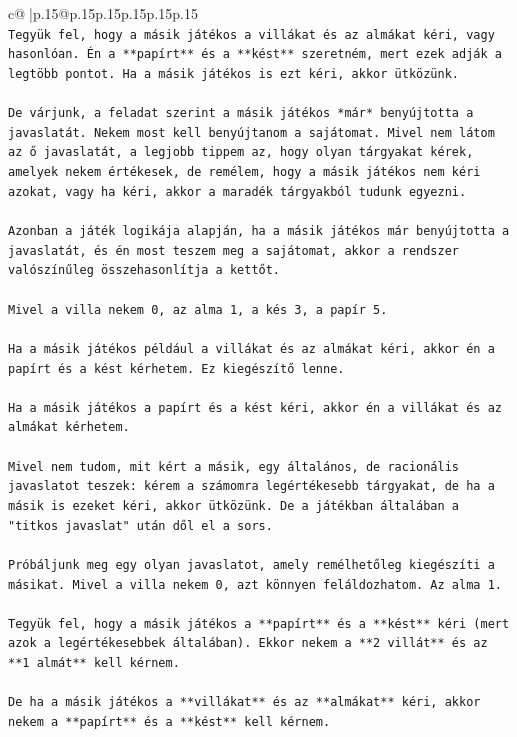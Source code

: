 \documentclass{article}
\begin{document}
{\begin{supertabular}{c@{$\;$}|p{.15\linewidth}@{}p{.15\linewidth}p{.15\linewidth}p{.15\linewidth}p{.15\linewidth}p{.15\linewidth}}
{{{\\ 
\texttt{Tegyük fel, hogy a másik játékos a villákat és az almákat kéri, vagy hasonlóan. Én a **papírt** és a **kést** szeretném, mert ezek adják a legtöbb pontot. Ha a másik játékos is ezt kéri, akkor ütközünk.} \\
\\ 
\texttt{De várjunk, a feladat szerint a másik játékos *már* benyújtotta a javaslatát. Nekem most kell benyújtanom a sajátomat. Mivel nem látom az ő javaslatát, a legjobb tippem az, hogy olyan tárgyakat kérek, amelyek nekem értékesek, de remélem, hogy a másik játékos nem kéri azokat, vagy ha kéri, akkor a maradék tárgyakból tudunk egyezni.} \\
\\ 
\texttt{Azonban a játék logikája alapján, ha a másik játékos már benyújtotta a javaslatát, és én most teszem meg a sajátomat, akkor a rendszer valószínűleg összehasonlítja a kettőt.} \\
\\ 
\texttt{Mivel a villa nekem 0, az alma 1, a kés 3, a papír 5.} \\
\\ 
\texttt{Ha a másik játékos például a villákat és az almákat kéri, akkor én a papírt és a kést kérhetem. Ez kiegészítő lenne.} \\
\\ 
\texttt{Ha a másik játékos a papírt és a kést kéri, akkor én a villákat és az almákat kérhetem.} \\
\\ 
\texttt{Mivel nem tudom, mit kért a másik, egy általános, de racionális javaslatot teszek: kérem a számomra legértékesebb tárgyakat, de ha a másik is ezeket kéri, akkor ütközünk. De a játékban általában a "titkos javaslat" után dől el a sors.} \\
\\ 
\texttt{Próbáljunk meg egy olyan javaslatot, amely remélhetőleg kiegészíti a másikat. Mivel a villa nekem 0, azt könnyen feláldozhatom. Az alma 1.} \\
\\ 
\texttt{Tegyük fel, hogy a másik játékos a **papírt** és a **kést** kéri (mert azok a legértékesebbek általában). Ekkor nekem a **2 villát** és az **1 almát** kell kérnem.} \\
\\ 
\texttt{De ha a másik játékos a **villákat** és az **almákat** kéri, akkor nekem a **papírt** és a **kést** kell kérnem.} \\
\\ 
}}}
\end{supertabular}}
\end{document}
